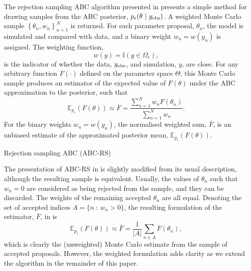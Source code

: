 \documentclass[review]{siamonline190516}
\begin{document}
The rejection sampling ABC algorithm presented in  presents a simple method for drawing samples from the ABC posterior, $p_\epsilon(\theta~|~y_{\mathrm{obs}})$.
A weighted Monte Carlo sample $\left\{ \theta_n, w_n \right\}_{n=1}^N$ is returned.
For each parameter proposal, $\theta_n$, the model is simulated and compared with data, and a binary weight $w_n = w(y_n)$ is assigned. 
The weighting function,
\[
 w(y) = \mathbb I(y \in \Omega_\epsilon),
\]
is the indicator of whether the data, $y_{\mathrm{obs}}$, and simulation, $y$, are close.
For any arbitrary function $F(\cdot)$ defined on the parameter space $\Theta$, this Monte Carlo sample produces an estimator of the expected value of $F(\theta)$ under the ABC approximation to the posterior, such that
\begin{equation}
 \label{eq:estimate}
 \mathbb E_{p_\epsilon}(F(\theta)) \approx \bar F = \frac{\sum_{n=1}^N w_n F(\theta_n)}{\sum_{n=1}^N w_n}.
\end{equation}
For the binary weights $w_n = w(y_n)$, the normalised weighted sum, $\bar F$, is an unbiased estimate of the approximated posterior mean, $\mathbb E_{p_\epsilon}(F(\theta))$.

\begin{algorithm}
\caption{Rejection sampling ABC (ABC-RS)}
\label{ABC:Rejection}
\begin{algorithmic}[1]
\REPEAT{}
\end{algorithmic}
\end{algorithm}

The presentation of ABC-RS in  is slightly modified from its usual description, although the resulting sample is equivalent.
Usually, the values of $\theta_n$ such that $w_n=0$ are considered as being rejected from the sample, and they can be discarded.
The weights of the remaining accepted $\theta_n$ are all equal.
Denoting the set of accepted indices $A = \{ n~:~w_n>0 \}$,
the resulting formulation of the estimator, $\bar F$, in  is 
\[
 \mathbb E_{p_\epsilon}(F(\theta)) \approx \bar F = \frac{1}{|A|} \sum_{n \in A} F(\theta_n),
\]
which is clearly the (unweighted) Monte Carlo estimate from the sample of accepted proposals.
However, the weighted formulation adds clarity as we extend the algorithm in the remainder of this paper.
\end{document}
